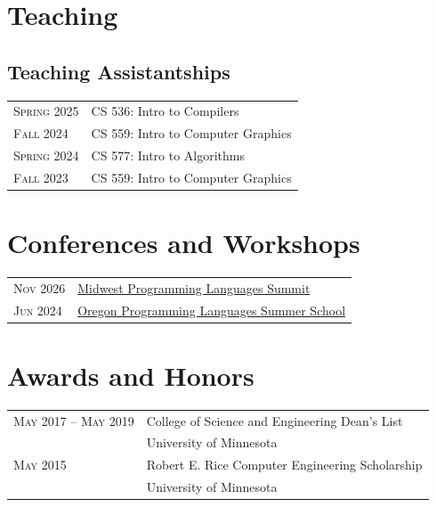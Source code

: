 \documentclass{article} %
\begin{document}
\section{Teaching}

\subsection{Teaching Assistantships}
\begin{tabular}{R{4cm}p{11cm}}
    \textsc{Spring 2025} & CS 536: Intro to Compilers \\
    \textsc{Fall 2024} & CS 559: Intro to Computer Graphics \\
    \textsc{Spring 2024} & CS 577: Intro to Algorithms \\
    \textsc{Fall 2023} & CS 559: Intro to Computer Graphics \\
\end{tabular}

\section{Conferences and Workshops}

\begin{tabular}{R{4cm}p{11cm}}
    \textsc{Nov 2026} & \href{https://2026.mwpls.org/}{Midwest Programming Languages Summit} \\
    \textsc{Jun 2024} & \href{https://www.cs.uoregon.edu/research/summerschool/summer24/}{Oregon Programming Languages Summer School} \\
\end{tabular}


\section{Awards and Honors}

\begin{tabular}{R{4cm}p{11cm}}
    \textsc{May 2017 -- May 2019} & College of Science and Engineering Dean's List\\
    & \footnotesize University of Minnesota\\
    \textsc{May 2015} & Robert E. Rice Computer Engineering Scholarship\\
    & \footnotesize University of Minnesota\\
\end{tabular}
\end{document}
